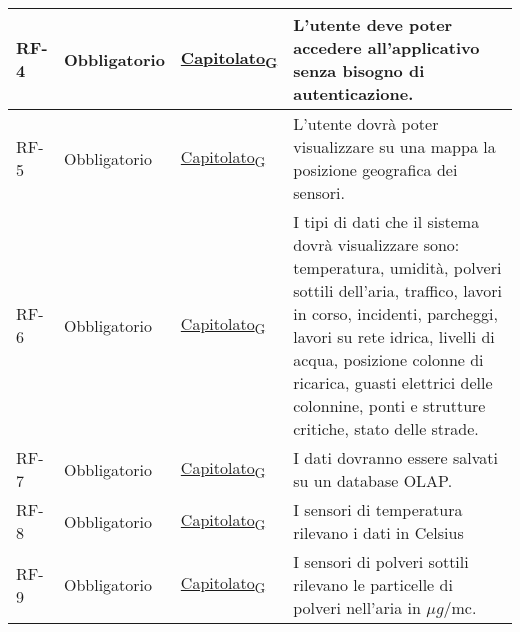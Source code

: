 \begin{longtable}{|>{\centering\arraybackslash}m{}|>{\centering\arraybackslash}m{}|>{\centering\arraybackslash}m{}|>{\centering\arraybackslash}m{}|}
	RF-4            & Obbligatorio        & \href{https://7last.github.io/docs/rtb/documentazione-interna/glossario#capitolato}{Capitolato\textsubscript{G}}     & L'utente deve poter accedere all'applicativo senza bisogno di autenticazione.                                                                                                                                                                                                                                      \\\hline
	RF-5            & Obbligatorio        & \href{https://7last.github.io/docs/rtb/documentazione-interna/glossario#capitolato}{Capitolato\textsubscript{G}}     & L'utente dovrà poter visualizzare su una mappa la posizione geografica dei sensori.                                                                                                                                                                                                                                \\\hline
	RF-6            & Obbligatorio        & \href{https://7last.github.io/docs/rtb/documentazione-interna/glossario#capitolato}{Capitolato\textsubscript{G}}     & I tipi di dati che il sistema dovrà visualizzare sono: temperatura, umidità, polveri sottili dell’aria, traffico, lavori in corso, incidenti, parcheggi, lavori su rete idrica, livelli di acqua, posizione colonne di ricarica, guasti elettrici delle colonnine, ponti e strutture critiche, stato delle strade. \\\hline
	RF-7            & Obbligatorio        & \href{https://7last.github.io/docs/rtb/documentazione-interna/glossario#capitolato}{Capitolato\textsubscript{G}}     & I dati dovranno essere salvati su un database OLAP.                                                                                                                                                                                                                                                                \\\hline
	RF-8            & Obbligatorio        & \href{https://7last.github.io/docs/rtb/documentazione-interna/glossario#capitolato}{Capitolato\textsubscript{G}}     & I sensori di temperatura rilevano i dati in Celsius                                                                                                                                                                                                                                                                \\\hline
	RF-9            & Obbligatorio        & \href{https://7last.github.io/docs/rtb/documentazione-interna/glossario#capitolato}{Capitolato\textsubscript{G}}     & I sensori di polveri sottili rilevano le particelle di polveri nell’aria in $\mu g$/mc.                                                                                                                                                                                                                            \\\hline

\end{longtable}
